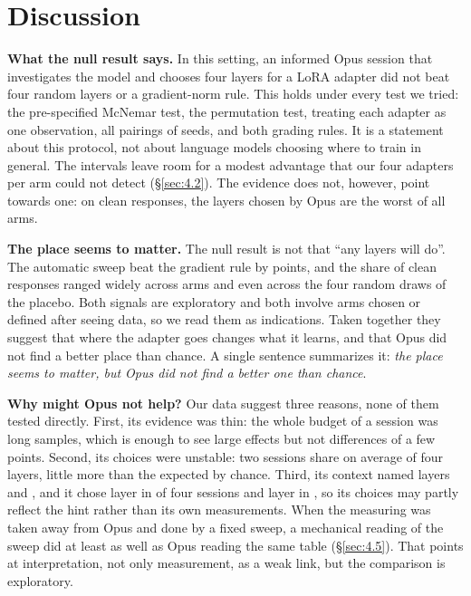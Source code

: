 \documentclass[11pt]{article}
\begin{document}
\section{Discussion}\label{sec:5}

\textbf{What the null result says.} In this setting, an informed Opus session that investigates the model and chooses four layers for a LoRA adapter did not beat four random layers or a gradient-norm rule. This holds under every test we tried: the pre-specified McNemar test, the permutation test, treating each adapter as one observation, all pairings of seeds, and both grading rules. It is a statement about this protocol, not about language models choosing where to train in general. The intervals leave room for a modest advantage that our four adapters per arm could not detect (\S\ref{sec:4.2}). The evidence does not, however, point towards one: on clean responses, the layers chosen by Opus are the worst of all arms.

\textbf{The place seems to matter.} The null result is not that ``any layers will do''. The automatic sweep beat the gradient rule by  points, and the share of clean responses ranged widely across arms and even across the four random draws of the placebo. Both signals are exploratory and both involve arms chosen or defined after seeing data, so we read them as indications. Taken together they suggest that where the adapter goes changes what it learns, and that Opus did not find a better place than chance. A single sentence summarizes it: \emph{the place seems to matter, but Opus did not find a better one than chance}.

\textbf{Why might Opus not help?} Our data suggest three reasons, none of them tested directly. First, its evidence was thin: the whole budget of a session was \OpusLongSamples{} long samples, which is enough to see large effects but not differences of a few points. Second, its choices were unstable: two sessions share on average \OpusSharedMean{} of four layers, little more than the \OpusSharedChance{} expected by chance. Third, its context named layers \MitLayerA{} and \MitLayerB{}, and it chose layer \MitLayerA{} in \OpusLayerFifteen{} of four sessions and layer \MitLayerB{} in \OpusLayerNineteen{}, so its choices may partly reflect the hint rather than its own measurements. When the measuring was taken away from Opus and done by a fixed sweep, a mechanical reading of the sweep did at least as well as Opus reading the same table (\S\ref{sec:4.5}). That points at interpretation, not only measurement, as a weak link, but the comparison is exploratory.
\end{document}
